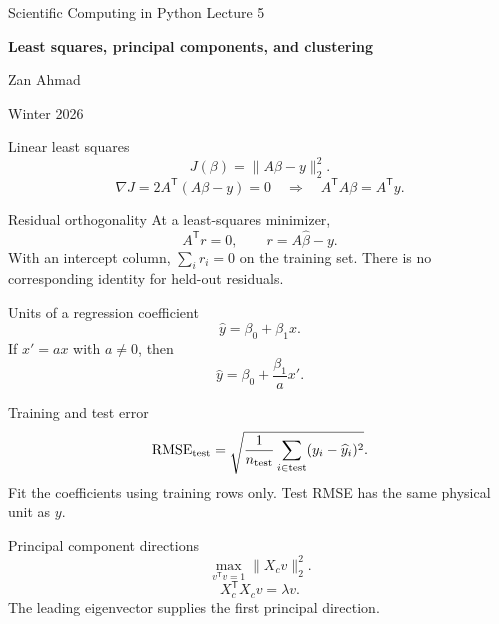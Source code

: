 \documentclass[aspectratio=169,11pt]{beamer}
\newcommand{\notestarget}{notes.pdf}\newcommand{\noteslabel}{Notes}
\begin{document}
\begin{frame}[plain]\vfill
{\small\color{accent} Scientific Computing in Python \quad Lecture 5}\par\medskip
{\raggedright{}\LARGE\bfseries\color{ink} Least squares, principal components, and clustering}\par\bigskip
Zan Ahmad\par\smallskip
{\small Winter 2026}\par\vfill\end{frame}
\renewcommand{\notestarget}{notes.pdf\#note-linear-least-squares}
\begin{frame}[t,fragile,label=slide-linear-least-squares]{Linear least squares}
\[
J(\beta)=\|A\beta-y\|_2^2.
\]
\pause{}
\[
\nabla J=2A^{\mathsf T}(A\beta-y)=0
\quad\Longrightarrow\quad A^{\mathsf T}A\beta=A^{\mathsf T}y.
\]
\end{frame}
\renewcommand{\notestarget}{notes.pdf\#note-linear-least-squares}
\begin{frame}[t,fragile,label=slide-residual-orthogonality]{Residual orthogonality}
At a least-squares minimizer,
\[
A^{\mathsf T}r=0,\qquad r=A\widehat\beta-y.
\]
\pause{}
With an intercept column, $\sum_i r_i=0$ on the training set. There is no corresponding identity for held-out residuals.
\end{frame}
\renewcommand{\notestarget}{notes.pdf\#note-units-of-a-regression-coefficient}
\begin{frame}[t,fragile,label=slide-units-of-a-regression-coefficient]{Units of a regression coefficient}
\[
\widehat y=\beta_0+\beta_1x.
\]
If $x'=ax$ with $a\ne0$, then
\pause{}
\[
\widehat y=\beta_0+\frac{\beta_1}{a}x'.
\]
\end{frame}
\renewcommand{\notestarget}{notes.pdf\#note-fitted-transformations-and-evaluation}
\begin{frame}[t,fragile,label=slide-training-and-test-error]{Training and test error}
\[
\operatorname{RMSE}_{\rm test}=\sqrt{\frac1{n_{\rm test}}\sum_{i\in\rm test}(y_i-\widehat y_i)^2}.
\]
\pause{}
Fit the coefficients using training rows only. Test RMSE has the same physical unit as $y$.
\end{frame}
\renewcommand{\notestarget}{notes.pdf\#note-principal-component-directions}
\begin{frame}[t,fragile,label=slide-principal-component-directions]{Principal component directions}
\[
\max_{v^{\mathsf T}v=1}\|X_cv\|_2^2.
\]
\pause{}
\[
X_c^{\mathsf T}X_cv=\lambda v.
\]
The leading eigenvector supplies the first principal direction.
\end{frame}
\end{document}
